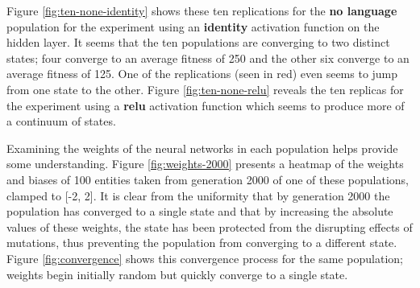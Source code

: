 \documentclass[12pt,a4paper,twoside,openright]{report}
\begin{document}
Figure \ref{fig:ten-none-identity} shows these ten replications for the {\bf no language} population for the experiment using an {\bf identity} activation function on the hidden layer. It seems that the ten populations are converging to two distinct states; four converge to an average fitness of 250 and the other six converge to an average fitness of 125. One of the replications (seen in red) even seems to jump from one state to the other. Figure \ref{fig:ten-none-relu} reveals the ten replicas for the experiment using a {\bf relu} activation function which seems to produce more of a continuum of states.

Examining the weights of the neural networks in each population helps provide some understanding. Figure \ref{fig:weights-2000} presents a heatmap of the weights and biases of 100 entities taken from generation 2000 of one of these populations, clamped to [-2, 2]. It is clear from the uniformity that by generation 2000 the population has converged to a single state and that by increasing the absolute values of these weights, the state has been protected from the disrupting effects of mutations, thus preventing the population from converging to a different state. Figure \ref{fig:convergence} shows this convergence process for the same population; weights begin initially random but quickly converge to a single state.
\end{document}
